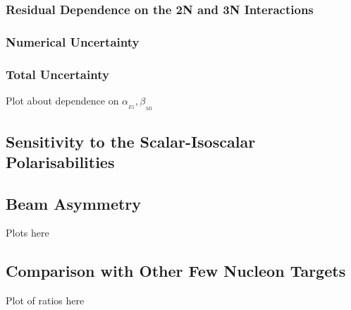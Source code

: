 \documentclass[12pt]{article}
\newcommand{\al}{\alpha_{_{E1}}}
\newcommand{\be}{\beta_{_{M1}}}
\newcommand{\3}{\ss}
\numberwithin{equation}{section}
\begin{document}
  \subsubsection{Residual Dependence on the 2N and 3N Interactions}
  \subsubsection{Numerical Uncertainty}
  \subsubsection{Total Uncertainty}
  Plot about dependence on $\al,\be$
  \subsection{Sensitivity to the Scalar-Isoscalar Polarisabilities}
  \subsection{Beam Asymmetry}
  Plots here
  \subsection{Comparison with Other Few Nucleon Targets}
  Plot of ratios here
\end{document}
